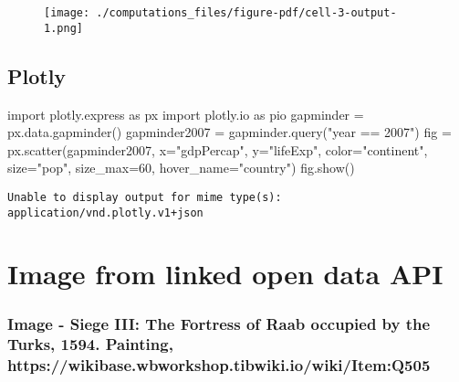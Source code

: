\documentclass[
  letterpaper,
  DIV=11,
  numbers=noendperiod]{scrreprt}
\newenvironment{Shaded}{\begin{snugshade}}{\end{snugshade}}
\newcommand{\DecValTok}[1]{\textcolor[rgb]{0.68,0.00,0.00}{#1}}
\newcommand{\ImportTok}[1]{\textcolor[rgb]{0.00,0.46,0.62}{#1}}
\newcommand{\NormalTok}[1]{\textcolor[rgb]{0.00,0.23,0.31}{#1}}
\newcommand{\OperatorTok}[1]{\textcolor[rgb]{0.37,0.37,0.37}{#1}}
\newcommand{\StringTok}[1]{\textcolor[rgb]{0.13,0.47,0.30}{#1}}
\begin{document}
\begin{figure}[H]

{\centering \texttt{[image: ./computations\_files/figure-pdf/cell-3-output-1.png]}

}

\end{figure}

\hypertarget{plotly}{%
\section{Plotly}\label{plotly}}

\begin{Shaded}
\begin{Highlighting}[]
\ImportTok{import}\NormalTok{ plotly.express }\ImportTok{as}\NormalTok{ px}
\ImportTok{import}\NormalTok{ plotly.io }\ImportTok{as}\NormalTok{ pio}
\NormalTok{gapminder }\OperatorTok{=}\NormalTok{ px.data.gapminder()}
\NormalTok{gapminder2007 }\OperatorTok{=}\NormalTok{ gapminder.query(}\StringTok{"year == 2007"}\NormalTok{)}
\NormalTok{fig }\OperatorTok{=}\NormalTok{ px.scatter(gapminder2007, }
\NormalTok{                 x}\OperatorTok{=}\StringTok{"gdpPercap"}\NormalTok{, y}\OperatorTok{=}\StringTok{"lifeExp"}\NormalTok{, color}\OperatorTok{=}\StringTok{"continent"}\NormalTok{, }
\NormalTok{                 size}\OperatorTok{=}\StringTok{"pop"}\NormalTok{, size\_max}\OperatorTok{=}\DecValTok{60}\NormalTok{,}
\NormalTok{                 hover\_name}\OperatorTok{=}\StringTok{"country"}\NormalTok{)}
\NormalTok{fig.show()}
\end{Highlighting}
\end{Shaded}

\begin{verbatim}
Unable to display output for mime type(s): application/vnd.plotly.v1+json
\end{verbatim}


\hypertarget{image-from-linked-open-data-api}{%
\chapter{Image from linked open data
API}\label{image-from-linked-open-data-api}}

\hypertarget{image---siege-iii-the-fortress-of-raab-occupied-by-the-turks-1594.-painting-httpswikibase.wbworkshop.tibwiki.iowikiitemq505}{%
\subsection{Image - Siege III: The Fortress of Raab occupied by the
Turks, 1594. Painting,
https://wikibase.wbworkshop.tibwiki.io/wiki/Item:Q505}\label{image---siege-iii-the-fortress-of-raab-occupied-by-the-turks-1594.-painting-httpswikibase.wbworkshop.tibwiki.iowikiitemq505}}
\end{document}
